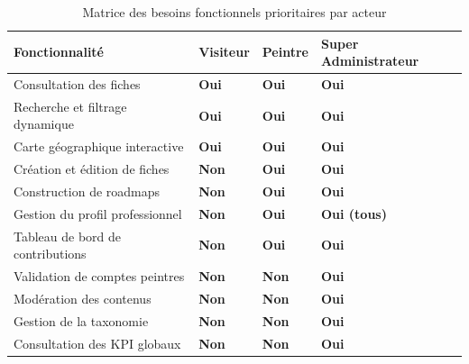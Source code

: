 \documentclass[12pt,a4paper]{report}
\newcommand{\tableheader}[1]{%
  \cellcolor{HeaderBg}\textbf{\color{white}#1}}
\begin{document}
\vspace{0.5em}
\begin{table}[H]
\centering
\caption{Matrice des besoins fonctionnels prioritaires par acteur}
\label{tab:matrice_besoins}
\renewcommand{\arraystretch}{1.5}
\small
\begin{tabular}{>{\raggedright\arraybackslash}p{5.5cm}
                >{\centering\arraybackslash}p{2.0cm}
                >{\centering\arraybackslash}p{2.2cm}
                >{\centering\arraybackslash}p{2.5cm}}
\toprule
\tableheader{Fonctionnalité} &
\tableheader{Visiteur} &
\tableheader{Peintre} &
\tableheader{Super Administrateur} \\
\midrule
\rowcolor{PBCLightGray}
Consultation des fiches & \textcolor{PBCGreen}{\textbf{Oui}} & \textcolor{PBCGreen}{\textbf{Oui}} & \textcolor{PBCGreen}{\textbf{Oui}} \\
Recherche et filtrage dynamique & \textcolor{PBCGreen}{\textbf{Oui}} & \textcolor{PBCGreen}{\textbf{Oui}} & \textcolor{PBCGreen}{\textbf{Oui}} \\
\rowcolor{PBCLightGray}
Carte géographique interactive & \textcolor{PBCGreen}{\textbf{Oui}} & \textcolor{PBCGreen}{\textbf{Oui}} & \textcolor{PBCGreen}{\textbf{Oui}} \\
Création et édition de fiches & \textcolor{PBCRed}{\textbf{Non}} & \textcolor{PBCGreen}{\textbf{Oui}} & \textcolor{PBCGreen}{\textbf{Oui}} \\
\rowcolor{PBCLightGray}
Construction de roadmaps & \textcolor{PBCRed}{\textbf{Non}} & \textcolor{PBCGreen}{\textbf{Oui}} & \textcolor{PBCGreen}{\textbf{Oui}} \\
Gestion du profil professionnel & \textcolor{PBCRed}{\textbf{Non}} & \textcolor{PBCGreen}{\textbf{Oui}} & \textcolor{PBCGreen}{\textbf{Oui (tous)}} \\
\rowcolor{PBCLightGray}
Tableau de bord de contributions & \textcolor{PBCRed}{\textbf{Non}} & \textcolor{PBCGreen}{\textbf{Oui}} & \textcolor{PBCGreen}{\textbf{Oui}} \\
Validation de comptes peintres & \textcolor{PBCRed}{\textbf{Non}} & \textcolor{PBCRed}{\textbf{Non}} & \textcolor{PBCGreen}{\textbf{Oui}} \\
\rowcolor{PBCLightGray}
Modération des contenus & \textcolor{PBCRed}{\textbf{Non}} & \textcolor{PBCRed}{\textbf{Non}} & \textcolor{PBCGreen}{\textbf{Oui}} \\
Gestion de la taxonomie & \textcolor{PBCRed}{\textbf{Non}} & \textcolor{PBCRed}{\textbf{Non}} & \textcolor{PBCGreen}{\textbf{Oui}} \\
\rowcolor{PBCLightGray}
Consultation des KPI globaux & \textcolor{PBCRed}{\textbf{Non}} & \textcolor{PBCRed}{\textbf{Non}} & \textcolor{PBCGreen}{\textbf{Oui}} \\
\bottomrule
\end{tabular}
\end{table}
\end{document}
